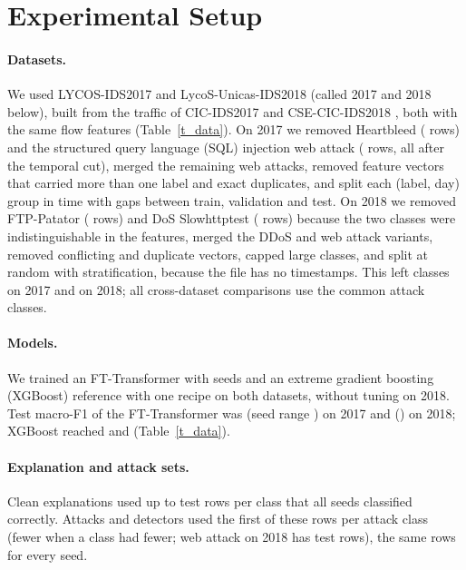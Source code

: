 \section{Experimental Setup}
\label{sec:setup}

\paragraph{Datasets.}
We used LYCOS-IDS2017 and LycoS-Unicas-IDS2018 (called 2017 and 2018 below), built from the traffic of CIC-IDS2017
and CSE-CIC-IDS2018 \cite{sharafaldin2018,aws_cse_cic_ids2018}, both with the same \nFeatures{} flow features (Table~\ref{t_data}).
On 2017 we removed Heartbleed (\nHeartbleed{} rows) and the structured query language (SQL) injection web attack (\nSqlInjection{} rows, all after
the temporal cut), merged the remaining web attacks, removed feature vectors that carried more than one label and
exact duplicates, and split each (label, day) group in time with gaps between train, validation and test.
On 2018 we removed FTP-Patator (\nFtpRemoved{} rows) and DoS Slowhttptest (\nSlowhttpRemoved{} rows) because the two
classes were indistinguishable in the features, merged the DDoS and web attack variants, removed conflicting and
duplicate vectors, capped large classes, and split at random with stratification, because the file has no timestamps.
This left \nClassesSeventeen{} classes on 2017 and \nClassesEighteen{} on 2018; all cross-dataset comparisons use the
\nCommonClasses{} common attack classes.



\paragraph{Models.}
We trained an FT-Transformer with \nSeeds{} seeds and an extreme gradient boosting (XGBoost) reference with one recipe on both datasets, without
tuning on 2018.
Test macro-F1 of the FT-Transformer was \fOneFTTSeventeen{} (seed range \fOneFTTSeventeenRange) on 2017 and
\fOneFTTEighteen{} (\fOneFTTEighteenRange) on 2018; XGBoost reached \fOneXGBSeventeen{} and \fOneXGBEighteen{}
(Table~\ref{t_data}).

\paragraph{Explanation and attack sets.}
Clean explanations used up to \paramExplPerClass{} test rows per class that all seeds classified correctly.
Attacks and detectors used the first \paramPerClass{} of these rows per attack class (fewer when a class had fewer;
web attack on 2018 has \nWebTestEighteen{} test rows), the same rows for every seed.

